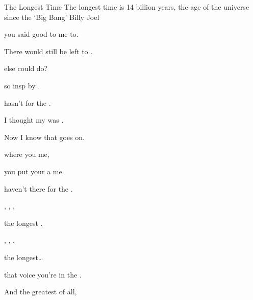 \begin{SBSong}{The Longest Time}
  {The longest time is 14 billion years, the age of the universe since the `Big Bang'}
  {Billy Joel}
  \begin{SBVerse}                                                                 
     you said good to me to.   

    There would still be  left to .

     else could  do?  

     so insp by .

     hasn't  for the  . 
  \end{SBVerse}
  \begin{SBVerse} 
     I  thought my  was .      

    Now I know that  goes on. 

     where you  me, 

     you put your  a me.

     haven't  there for the  .
  \end{SBVerse}
  \begin{SBChorus}  
    , , ,   

     the longest .     
      
    , , .  

     the longest\dots
  \end{SBChorus}                     
  \begin{SBVerse}   
     that voice you're  in the .    

    And the greatest  of all, 
    

\end{SBVerse}
\end{SBSong}
